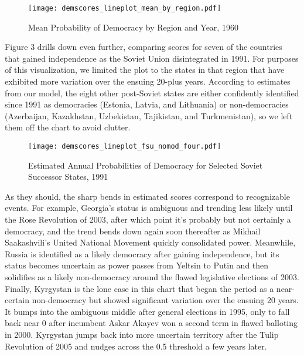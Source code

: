 \documentclass[letterpaper]{article}
\begin{document}
\begin{figure}
    \centering
    \texttt{[image: demscores\_lineplot\_mean\_by\_region.pdf]}
    \caption{Mean Probability of Democracy by Region and Year, 1960}
    \label{fig:region_lines}
\end{figure}

Figure 3 drills down even further, comparing scores for seven of the countries that gained independence as the Soviet Union disintegrated in 1991. For purposes of this visualization, we limited the plot to the states in that region that have exhibited more variation over the ensuing 20-plus years. According to estimates from our model, the eight other post-Soviet states are either confidently identified since 1991 as democracies (Estonia, Latvia, and Lithuania) or non-democracies (Azerbaijan, Kazakhstan, Uzbekistan, Tajikistan, and Turkmenistan), so we left them off the chart to avoid clutter.

\begin{figure}
    \centering
    \texttt{[image: demscores\_lineplot\_fsu\_nomod\_four.pdf]}
    \caption{Estimated Annual Probabilities of Democracy for Selected Soviet Successor States, 1991}
    \label{fig:fsu_lines}
\end{figure}

As they should, the sharp bends in estimated scores correspond to recognizable events. For example, Georgia’s status is ambiguous and trending less likely until the Rose Revolution of 2003, after which point it’s probably but not certainly a democracy, and the trend bends down again soon thereafter as Mikhail Saakashvili's United National Movement quickly consolidated power. Meanwhile, Russia is identified as a likely democracy after gaining independence, but its status becomes uncertain as power passes from Yeltsin to Putin and then solidifies as a likely non-democracy around the flawed legislative elections of 2003. Finally, Kyrgystan is the lone case in this chart that began the period as a near-certain non-democracy but showed significant variation over the ensuing 20 years. It bumps into the ambiguous middle after general elections in 1995, only to fall back near 0 after incumbent Askar Akayev won a second term in flawed balloting in 2000. Kyrgystan jumps back into more uncertain territory after the Tulip Revolution of 2005 and nudges across the 0.5 threshold a few years later.
\end{document}
